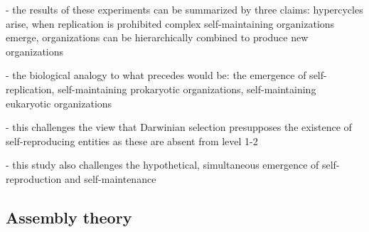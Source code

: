 \documentclass[11pt]{article}
\begin{document}
\begin{markdown}
- the results of these experiments can be summarized by three claims: hypercycles arise, when replication is prohibited complex self-maintaining organizations emerge, organizations can be hierarchically combined to produce new organizations
    
- the biological analogy to what precedes would be: the emergence of self-replication, self-maintaining prokaryotic organizations, self-maintaining eukaryotic organizations
    
- this challenges the view that Darwinian selection presupposes the existence of self-reproducing entities as these are absent from level 1-2
    
- this study also challenges the hypothetical, simultaneous emergence of self-reproduction and self-maintenance
	
\end{markdown}

\clearpage

\subsection{Assembly theory}

\subsubsection{\texorpdfstring{\cite{marshall_probabilistic_2017}}{}}
\end{document}

